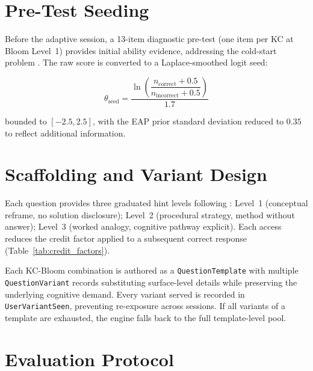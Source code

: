 \section{Pre-Test Seeding}
\label{sec:meth_pretest}

Before the adaptive session, a 13-item diagnostic pre-test (one item per KC
at Bloom Level~1) provides initial ability evidence, addressing the cold-start
problem \parencite{matos2025}. The raw score is converted to a Laplace-smoothed
logit seed:

\begin{equation}
  \theta_{\text{seed}} = \frac{\ln\!\left(\dfrac{n_{\text{correct}} + 0.5}
    {n_{\text{incorrect}} + 0.5}\right)}{1.7}
  \label{eq:theta_seed_meth}
\end{equation}

bounded to $[-2.5, 2.5]$, with the EAP prior standard deviation reduced to
$0.35$ to reflect additional information.

\section{Scaffolding and Variant Design}
\label{sec:meth_scaffolding}

Each question provides three graduated hint levels following
\textcite{koedinger2007}: Level~1 (conceptual reframe, no solution disclosure);
Level~2 (procedural strategy, method without answer); Level~3 (worked analogy,
cognitive pathway explicit). Each access reduces the credit factor applied to
a subsequent correct response (Table~\ref{tab:credit_factors}).

Each KC-Bloom combination is authored as a \texttt{Question\-Template} with
multiple \texttt{Question\-Variant} records substituting surface-level details
while preserving the underlying cognitive demand. Every variant served is
recorded in \texttt{User\-Variant\-Seen}, preventing re-exposure across sessions.
If all variants of a template are exhausted, the engine falls back to the
full template-level pool.

\section{Evaluation Protocol}
\label{sec:meth_evaluation}

